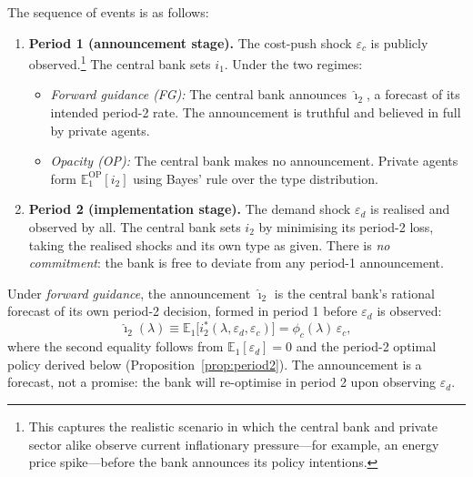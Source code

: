 The sequence of events is as follows:

\begin{enumerate}[label=\arabic*.]
  \item \textbf{Period 1 (announcement stage).} The cost-push shock $\varepsilon_{c}$
        is publicly observed.\footnote{This captures the realistic scenario in which
        the central bank and private sector alike observe current inflationary
        pressure---for example, an energy price spike---before the bank announces its
        policy intentions.} The central bank sets $i_1$. Under the two regimes:
        \begin{itemize}
          \item \textit{Forward guidance (FG):} The central bank announces
                $\hat{\imath}_2$, a forecast of its intended period-2 rate. The
                announcement is truthful and believed in full by private agents.
          \item \textit{Opacity (OP):} The central bank makes no announcement.
                Private agents form $\mathbb{E}_1^{\mathrm{OP}}[i_2]$ using
                Bayes' rule over the type distribution.
        \end{itemize}
  \item \textbf{Period 2 (implementation stage).} The demand shock $\varepsilon_{d}$
        is realised and observed by all. The central bank sets $i_2$ by minimising its
        period-2 loss, taking the realised shocks and its own type as given. There is
        \emph{no commitment}: the bank is free to deviate from any period-1
        announcement.
\end{enumerate}

Under \emph{forward guidance}, the announcement $\hat{\imath}_2$ is the central bank's
rational forecast of its own period-2 decision, formed in period 1 before $\varepsilon_d$
is observed:
\begin{equation}
  \hat{\imath}_2(\lambda) \equiv \mathbb{E}_1\bigl[i_2^*(\lambda,
  \varepsilon_d, \varepsilon_c)\bigr]
  = \phi_c(\lambda)\,\varepsilon_c,
  \label{eq:FG_announcement}
\end{equation}
where the second equality follows from $\mathbb{E}_1[\varepsilon_d] = 0$ and the
period-2 optimal policy derived below (Proposition~\ref{prop:period2}). The
announcement is a forecast, not a promise: the bank will re-optimise in period 2 upon
observing $\varepsilon_d$.

